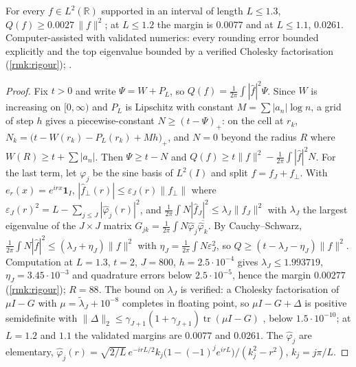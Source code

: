 \begin{theorem}[Positivity up to $L=1.3$, operator form]\label{thm:third-window}
For every $f\in L^2(\mathbb{R})$ supported in an interval of length $L\le1.3$,
$Q(f)\ge0.0027\,\|f\|^2$; at $L\le1.2$ the margin is $0.0077$ and at $L\le1.1$,
$0.0261$.  Computer-assisted with validated numerics: every rounding error bounded explicitly and the top eigenvalue bounded by a verified Cholesky factorisation (\cref{rmk:rigour}); .
\end{theorem}

\begin{proof}
Fix $t>0$ and write $\Psi=W+P_L$, so $Q(f)=\frac1{2\pi}\int|\hat f|^2\Psi$.
Since $W$ is increasing on $[0,\infty)$ and $P_L$ is Lipschitz with constant
$M=\sum|a_n|\log n$, a grid of step $h$ gives a piecewise-constant
$N\ge(t-\Psi)_+$: on the cell at $r_k$, $N_k=\bigl(t-W(r_k)-P_L(r_k)+Mh\bigr)_+$,
and $N=0$ beyond the radius $R$ where $W(R)\ge t+\sum|a_n|$.  Then
$\Psi\ge t-N$ and $Q(f)\ge t\|f\|^2-\frac1{2\pi}\int|\hat f|^2N$.
For the last term, let $\varphi_j$ be the sine basis of $L^2(I)$ and split
$f=f_J+f_\perp$.  With $e_r(x)=e^{irx}\mathbf{1}_I$, $|\hat f_\perp(r)|\le
\varepsilon_J(r)\|f_\perp\|$ where $\varepsilon_J(r)^2=L-\sum_{j\le J}|\hat\varphi_j(r)|^2$,
and $\frac1{2\pi}\int N|\hat f_J|^2\le\lambda_J\|f_J\|^2$ with $\lambda_J$ the
largest eigenvalue of the $J\times J$ matrix
$G_{jk}=\frac1{2\pi}\int N\hat\varphi_j\overline{\hat\varphi_k}$.  By
Cauchy--Schwarz, $\frac1{2\pi}\int N|\hat f|^2\le(\lambda_J+\eta_J)\|f\|^2$ with
$\eta_J=\frac1{2\pi}\int N\varepsilon_J^2$, so $Q\ge(t-\lambda_J-\eta_J)\|f\|^2$.
Computation at $L=1.3$, $t=2$, $J=800$, $h=2.5\cdot10^{-4}$ gives
$\lambda_J\le1.993719$, $\eta_J=3.45\cdot10^{-3}$ and quadrature errors below $2.5\cdot10^{-5}$, hence the margin $0.00277$ (\cref{rmk:rigour}); $R=88$.  The bound on $\lambda_J$ is verified: a Cholesky factorisation of $\mu I-G$ with $\mu=\tilde\lambda_J+10^{-8}$ completes in floating point, so $\mu I-G+\Delta$ is positive semidefinite with $\|\Delta\|_2\le\gamma_{J+1}(1+\gamma_{J+1})\operatorname{tr}(\mu I-G)$ \cite{higham02}, below $1.5\cdot10^{-10}$; at $L=1.2$ and $1.1$ the validated margins are $0.0077$ and $0.0261$.  The $\hat\varphi_j$ are elementary,
$\hat\varphi_j(r)=\sqrt{2/L}\,e^{-irL/2}k_j\bigl(1-(-1)^je^{irL}\bigr)/(k_j^2-r^2)$,
$k_j=j\pi/L$.
\end{proof}

